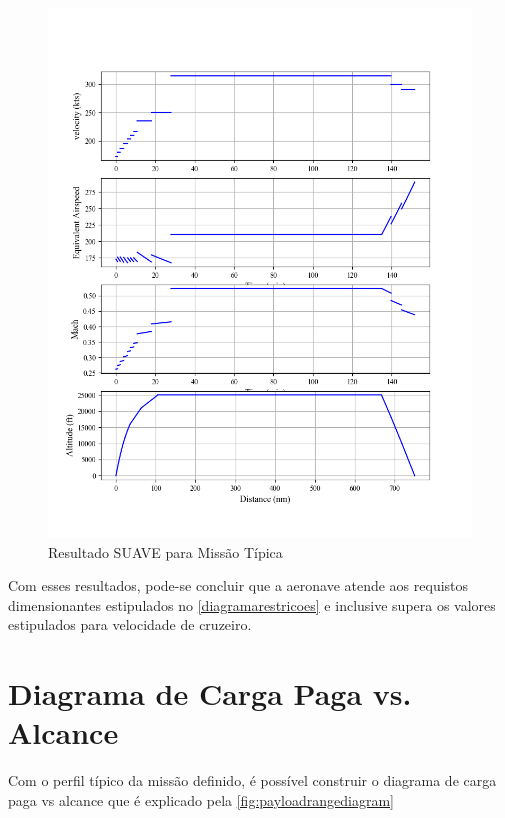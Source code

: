 \begin{figure}[H]
\centering
\includegraphics[width=1.\textwidth]{images/parte4/vel0.png}
\caption{Resultado SUAVE para Missão Típica}
\label{fig:vel_mission}
\end{figure}

Com esses resultados, pode-se concluir que a aeronave atende aos requistos dimensionantes estipulados no \autoref{diagramarestricoes} e inclusive supera os valores estipulados para velocidade de cruzeiro.


\section{Diagrama de Carga Paga vs. Alcance}

Com o perfil típico da missão definido, é possível construir o diagrama de carga paga vs alcance que é explicado pela \autoref{fig:payloadrangediagram}

